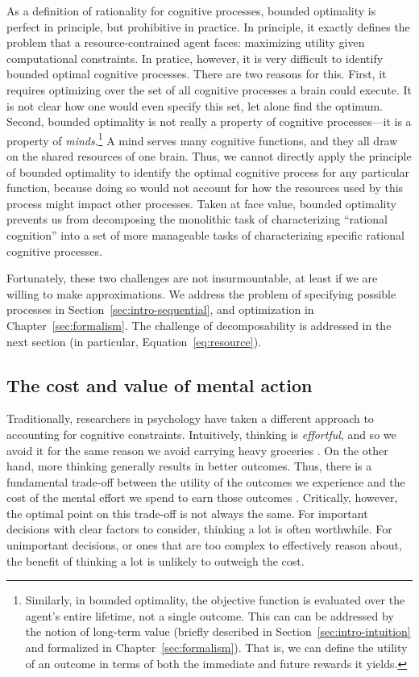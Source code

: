 As a definition of rationality for cognitive processes, bounded optimality is perfect in principle, but prohibitive in practice. In principle, it exactly defines the problem that a resource-contrained agent faces: maximizing utility given computational constraints. In pratice, however, it is very difficult to identify bounded optimal cognitive processes. There are two reasons for this. First, it requires optimizing over the set of all cognitive processes a brain could execute. It is not clear how one would even specify this set, let alone find the optimum. Second, bounded optimality is not really a property of cognitive processes---it is a property of \emph{minds}.\footnote{%
  Similarly, in bounded optimality, the objective function is evaluated over the agent's entire lifetime, not a single outcome. This can can be addressed by the notion of long-term value (briefly described in Section~\ref{sec:intro-intuition} and formalized in Chapter~\ref{sec:formalism}). That is, we can define the utility of an outcome in terms of both the immediate and future rewards it yields.
} A mind serves many cognitive functions, and they all draw on the shared resources of one brain. Thus, we cannot directly apply the principle of bounded optimality to identify the optimal cognitive process for any particular function, because doing so would not account for how the resources used by this process might impact other processes. Taken at face value, bounded optimality prevents us from decomposing the monolithic task of characterizing ``rational cognition'' into a set of more manageable tasks of characterizing specific rational cognitive processes.

Fortunately, these two challenges are not insurmountable, at least if we are willing to make approximations. We address the problem of specifying possible processes in Section~\ref{sec:intro-sequential}, and optimization in Chapter~\ref{sec:formalism}. The challenge of decomposability is addressed in the next section (in particular, Equation~\ref{eq:resource}).

\subsection{The cost and value of mental action}\label{sec:intro-cost}

Traditionally, researchers in psychology have taken a different approach to accounting for cognitive constraints. Intuitively, thinking is \emph{effortful}, and so we avoid it for the same reason we avoid carrying heavy groceries \citep{shenhav2017rational}. On the other hand, more thinking generally results in better outcomes. Thus, there is a fundamental trade-off between the utility of the outcomes we experience and the cost of the mental effort we spend to earn those outcomes \citep{kool2018mental}. Critically, however, the optimal point on this trade-off is not always the same. For important decisions with clear factors to consider, thinking a lot is often worthwhile. For unimportant decisions, or ones that are too complex to effectively reason about, the benefit of thinking a lot is unlikely to outweigh the cost.


